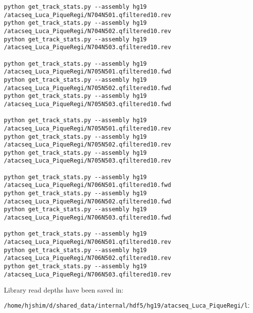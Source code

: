 \documentclass[11pt]{article}
\begin{document}
\begin{lstlisting}
python get_track_stats.py --assembly hg19 /atacseq_Luca_PiqueRegi/N704N501.qfiltered10.rev
python get_track_stats.py --assembly hg19 /atacseq_Luca_PiqueRegi/N704N502.qfiltered10.rev
python get_track_stats.py --assembly hg19 /atacseq_Luca_PiqueRegi/N704N503.qfiltered10.rev

python get_track_stats.py --assembly hg19 /atacseq_Luca_PiqueRegi/N705N501.qfiltered10.fwd
python get_track_stats.py --assembly hg19 /atacseq_Luca_PiqueRegi/N705N502.qfiltered10.fwd
python get_track_stats.py --assembly hg19 /atacseq_Luca_PiqueRegi/N705N503.qfiltered10.fwd

python get_track_stats.py --assembly hg19 /atacseq_Luca_PiqueRegi/N705N501.qfiltered10.rev
python get_track_stats.py --assembly hg19 /atacseq_Luca_PiqueRegi/N705N502.qfiltered10.rev
python get_track_stats.py --assembly hg19 /atacseq_Luca_PiqueRegi/N705N503.qfiltered10.rev

python get_track_stats.py --assembly hg19 /atacseq_Luca_PiqueRegi/N706N501.qfiltered10.fwd
python get_track_stats.py --assembly hg19 /atacseq_Luca_PiqueRegi/N706N502.qfiltered10.fwd
python get_track_stats.py --assembly hg19 /atacseq_Luca_PiqueRegi/N706N503.qfiltered10.fwd

python get_track_stats.py --assembly hg19 /atacseq_Luca_PiqueRegi/N706N501.qfiltered10.rev
python get_track_stats.py --assembly hg19 /atacseq_Luca_PiqueRegi/N706N502.qfiltered10.rev
python get_track_stats.py --assembly hg19 /atacseq_Luca_PiqueRegi/N706N503.qfiltered10.rev
\end{lstlisting}

Library read depths have been saved in:
\begin{lstlisting}
/home/hjshim/d/shared_data/internal/hdf5/hg19/atacseq_Luca_PiqueRegi/library.depth.txt
\end{lstlisting}
\end{document}

